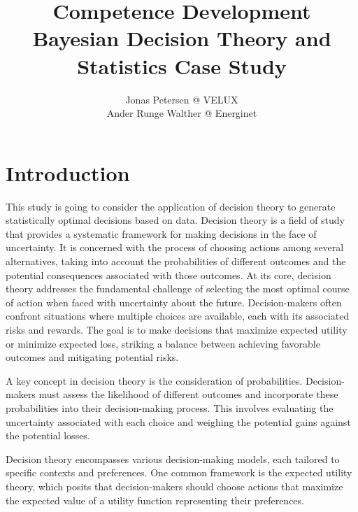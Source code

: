 \documentclass[a4paper,11pt, oneside]{article}
\theoremstyle{definition}
\begin{document}
	
	
	\begin{titlepage}
		\title{\small{Competence Development}\\
			\huge{Bayesian Decision Theory and Statistics Case Study}
			}
		\author{Jonas Petersen @ VELUX\\ Ander Runge Walther @ Energinet}
		\date{} %
		\maketitle
		\thispagestyle{empty}
	\end{titlepage}
	
	\newpage
	\tableofcontents

	
	
	
	\thispagestyle{plain}
	

	\section{Introduction}
	This study is going to consider the application of decision theory to generate statistically optimal decisions based on data. Decision theory is a field of study that provides a systematic framework for making decisions in the face of uncertainty. It is concerned with the process of choosing actions among several alternatives, taking into account the probabilities of different outcomes and the potential consequences associated with those outcomes. At its core, decision theory addresses the fundamental challenge of selecting the most optimal course of action when faced with uncertainty about the future. Decision-makers often confront situations where multiple choices are available, each with its associated risks and rewards. The goal is to make decisions that maximize expected utility or minimize expected loss, striking a balance between achieving favorable outcomes and mitigating potential risks.
	
	A key concept in decision theory is the consideration of probabilities. Decision-makers must assess the likelihood of different outcomes and incorporate these probabilities into their decision-making process. This involves evaluating the uncertainty associated with each choice and weighing the potential gains against the potential losses.
	
	Decision theory encompasses various decision-making models, each tailored to specific contexts and preferences. One common framework is the expected utility theory, which posits that decision-makers should choose actions that maximize the expected value of a utility function representing their preferences.
	
\end{document}
